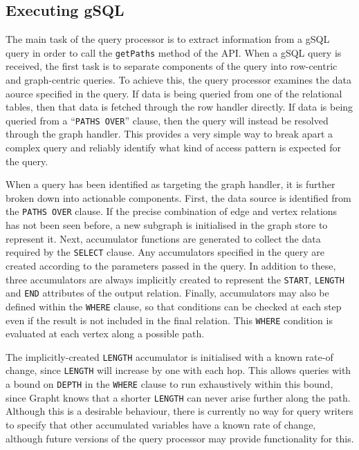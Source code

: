 \subsection{Executing gSQL}

The main task of the query processor is to extract information from a gSQL
query in order to call the \texttt{getPaths} method of the API. When a gSQL
query is received, the first task is to separate components of the query into
row-centric and graph-centric queries. To achieve this, the query processor examines the data aource specified in the query. If data is being queried from one of the
relational tables, then that data is fetched through the row handler directly.
If data is being queried from a ``\texttt{PATHS OVER}'' clause, then the query
will instead be resolved through the graph handler. This provides a very
simple way to break apart a complex query and reliably identify what kind of
access pattern is expected for the query.

 When a query has been
identified as targeting the graph handler, it is further broken down into
actionable components. First, the data source is identified from the
\texttt{PATHS OVER} clause. If the precise combination of edge and vertex
relations has not been seen before, a new subgraph is initialised in the graph store
to represent it. Next, accumulator functions are generated to collect the data
required by the \texttt{SELECT} clause. Any accumulators specified in the
query are created according to the parameters passed in the query. In addition
to these, three accumulators are always implicitly created to represent the
\texttt{START}, \texttt{LENGTH} and \texttt{END} attributes of the output
relation. Finally, accumulators may also be  defined within the \texttt{WHERE}
clause, so that conditions can be checked at each step even if the result is
not included in the final relation. This \texttt{WHERE} condition is evaluated
at each vertex along a possible path.

The implicitly-created \texttt{LENGTH} accumulator is initialised with
a known rate-of change, since \texttt{LENGTH} will increase by one with each hop. This allows queries with a bound on \texttt{DEPTH} in the
\texttt{WHERE} clause to run exhaustively within this bound, since
Grapht knows that a shorter \texttt{LENGTH} can never arise further along the
path. Although this is a desirable behaviour, there is currently no way for
query writers to specify that other accumulated variables have a known rate of
change, although future versions of the query processor may provide
functionality for this.

